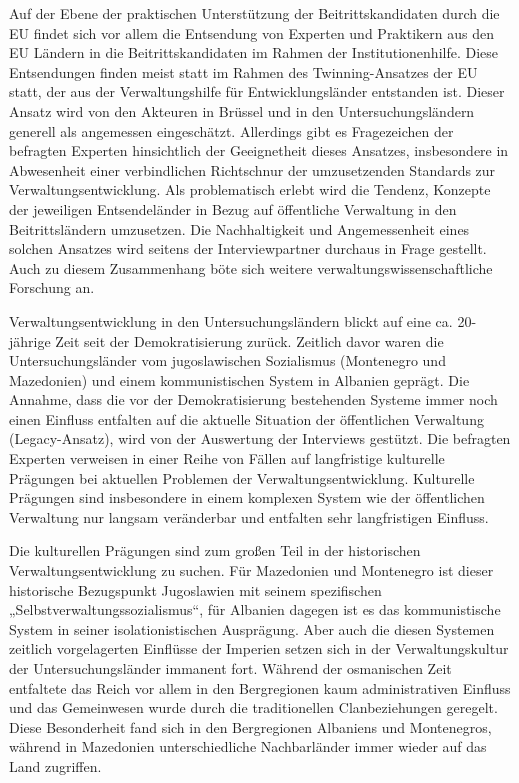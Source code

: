 Auf der Ebene der praktischen Unterstützung der Beitrittskandidaten durch die EU findet sich vor allem die Entsendung von Experten und Praktikern aus den EU Ländern in die Beitrittskandidaten im Rahmen der Institutionenhilfe. Diese Entsendungen finden meist statt im Rahmen des Twinning-Ansatzes der EU statt, der aus der Verwaltungshilfe für Entwicklungsländer entstanden ist. Dieser Ansatz wird von den Akteuren in Brüssel und in den Untersuchungsländern generell als angemessen eingeschätzt. Allerdings gibt es Fragezeichen der befragten Experten hinsichtlich der Geeignetheit dieses Ansatzes, insbesondere in Abwesenheit einer verbindlichen Richtschnur der umzusetzenden Standards zur Verwaltungsentwicklung. Als problematisch erlebt wird die Tendenz, Konzepte der jeweiligen Entsendeländer in Bezug auf öffentliche Verwaltung in den Beitrittsländern umzusetzen. Die Nachhaltigkeit und Angemessenheit eines solchen Ansatzes wird seitens der Interviewpartner durchaus in Frage gestellt. Auch zu diesem Zusammenhang böte sich weitere verwaltungswissenschaftliche Forschung an. \par
Verwaltungsentwicklung in den Untersuchungsländern blickt auf eine ca. 20-jährige Zeit seit der Demokratisierung zurück. Zeitlich davor waren die Untersuchungsländer vom jugoslawischen Sozialismus (Montenegro und Mazedonien) und einem kommunistischen System in Albanien geprägt. Die Annahme, dass die vor der Demokratisierung bestehenden Systeme immer noch einen Einfluss entfalten auf die aktuelle Situation der öffentlichen Verwaltung (Legacy-Ansatz), wird von der Auswertung der Interviews gestützt. Die befragten Experten verweisen in einer Reihe von Fällen auf langfristige kulturelle Prägungen bei aktuellen Problemen der Verwaltungsentwicklung. Kulturelle Prägungen sind insbesondere in einem komplexen System wie der öffentlichen Verwaltung nur langsam veränderbar und entfalten sehr langfristigen Einfluss.\par
Die kulturellen Prägungen sind zum großen Teil in der historischen Verwaltungsentwicklung zu suchen. Für Mazedonien und Montenegro ist dieser historische Bezugspunkt Jugoslawien mit seinem spezifischen „Selbstverwaltungssozialismus“, für Albanien dagegen ist es das kommunistische System in seiner isolationistischen Ausprägung. Aber auch die diesen Systemen zeitlich vorgelagerten Einflüsse der Imperien setzen sich in der Verwaltungskultur der Untersuchungsländer immanent fort. Während der osmanischen Zeit entfaltete das Reich vor allem in den Bergregionen kaum administrativen Einfluss und das Gemeinwesen wurde durch die traditionellen Clanbeziehungen geregelt. Diese Besonderheit fand sich in den Bergregionen Albaniens und Montenegros, während in Mazedonien unterschiedliche Nachbarländer immer wieder auf das Land zugriffen.\par
